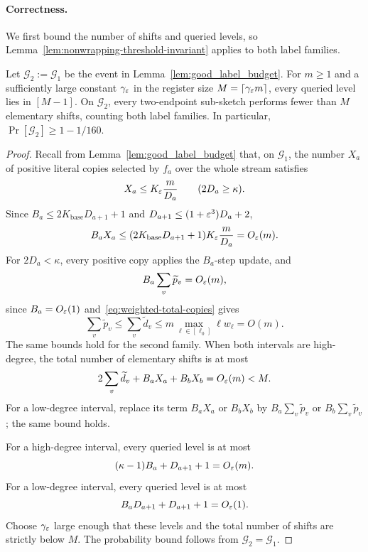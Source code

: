 \paragraph{Correctness.}
We first bound the number of shifts and queried levels, so Lemma~\ref{lem:nonwrapping-threshold-invariant} applies to both label families.
\begin{lemma}
\label{lem:two-endpoint-label-budget}
Let $\mathcal G_2:=\mathcal G_1$ be the event in Lemma~\ref{lem:good_label_budget}.
For $m\ge1$ and a sufficiently large constant $\gamma_\varepsilon$ in the register size $M=\lceil\gamma_\varepsilon m\rceil$, every queried level lies in $[M-1]$.
On $\mathcal G_2$, every two-endpoint sub-sketch performs fewer than $M$ elementary shifts, counting both label families.
In particular, $\Pr[\mathcal G_2]\ge1-1/160$.
\end{lemma}
\begin{proof}
Recall from Lemma~\ref{lem:good_label_budget} that, on $\mathcal G_1$, the number $X_a$ of positive literal copies selected by $f_a$ over the whole stream satisfies
\[
  X_a\le K_\varepsilon\frac{m}{D_a}\qquad(2D_a\ge\kappa).
\]
Since $B_a\le2K_{\mathrm{base}}D_{a+1}+1$ and $D_{a+1}\le(1+\varepsilon^3)D_a+2$,
\[
  B_aX_a\le(2K_{\mathrm{base}}D_{a+1}+1)K_\varepsilon\frac{m}{D_a}=O_\varepsilon(m).
\]
For $2D_a<\kappa$, every positive copy applies the $B_a$-step update, and
\[
  B_a\sum_v\widetilde p_v=O_\varepsilon(m),
\]
since $B_a=O_\varepsilon(1)$ and~\eqref{eq:weighted-total-copies} gives
\[
\sum_v\widetilde p_v\le\sum_v\widetilde d_v
\le m\max_{\ell\in[\ell_0]}\ell w_\ell=O(m).
\]
The same bounds hold for the second family.
When both intervals are high-degree, the total number of elementary shifts is at most
\[
  2\sum_v\widetilde d_v+B_aX_a+B_bX_b=O_\varepsilon(m)<M.
\]
For a low-degree interval, replace its term $B_aX_a$ or $B_bX_b$ by $B_a\sum_v\widetilde p_v$ or $B_b\sum_v\widetilde p_v$; the same bound holds.

For a high-degree interval, every queried level is at most
\[
  (\kappa-1)B_a+D_{a+1}+1=O_\varepsilon(m).
\]
For a low-degree interval, every queried level is at most
\[
  B_aD_{a+1}+D_{a+1}+1=O_\varepsilon(1).
\]
Choose $\gamma_\varepsilon$ large enough that these levels and the total number of shifts are strictly below $M$.
The probability bound follows from $\mathcal G_2=\mathcal G_1$.
\end{proof}

